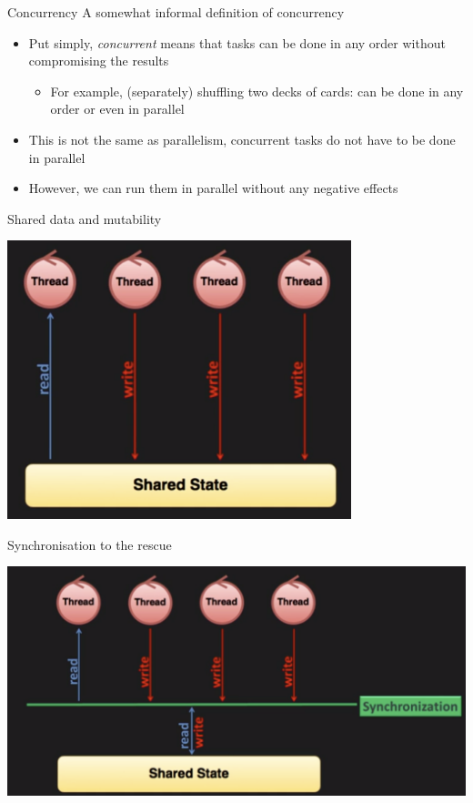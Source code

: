 \documentclass[12pt,xcolor=svgnames]{beamer}
\begin{document}
\begin{frame}{Concurrency}
A somewhat informal definition of concurrency

\begin{itemize}
\item Put simply, \emph{concurrent} means that tasks can be done in any order without compromising the results
\begin{itemize}
\item For example, (separately) shuffling two decks of cards: can be done in any order or even in parallel
\end{itemize}
\item This is not the same as parallelism, concurrent tasks do not have to be done in parallel
\item However, we can run them in parallel without any negative effects
\end{itemize}
\end{frame}

\begin{frame}{Shared data and mutability}
\centerline{\includegraphics[width=0.75\textwidth]{images/shared}}		
\end{frame}

\begin{frame}{Synchronisation to the rescue}
\centerline{\includegraphics[width=1\textwidth]{images/sync}}		
\end{frame}
\end{document}
